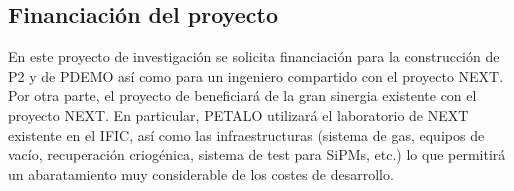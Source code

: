 \subsection*{Financiación del proyecto}

En este proyecto de investigación se solicita financiación para la construcción de P2 y de PDEMO así como para un ingeniero compartido con el proyecto NEXT. Por otra parte, el proyecto de beneficiará de la gran sinergia existente con el proyecto NEXT. En particular, PETALO utilizará el laboratorio de NEXT existente en el IFIC, así como las infraestructuras (sistema de gas, equipos de vacío, recuperación criogénica, sistema de test para SiPMs, etc.) lo que permitirá un abaratamiento muy considerable de los costes de desarrollo. 

%
%
%
%
%
%
%
%
%
%
%


























